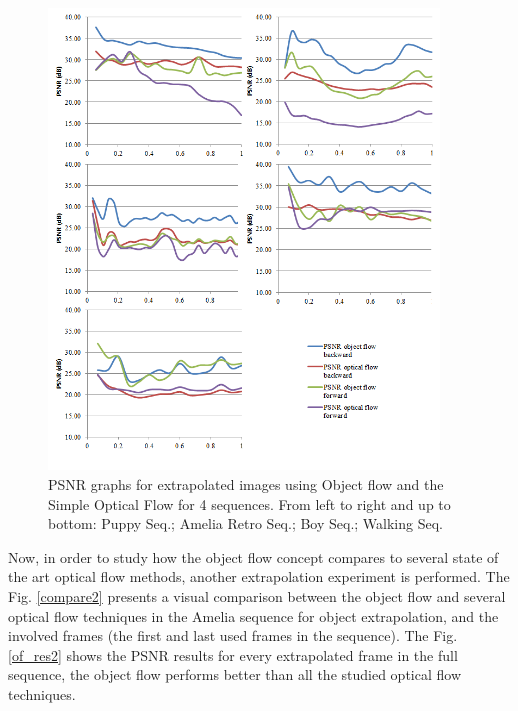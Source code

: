    \begin{figure}[hb]
      \centering
      \includegraphics[width=0.925\textwidth]{../images/psnr_v2.png}
      \caption{PSNR graphs for extrapolated images using Object flow and the Simple Optical Flow for 4 sequences. From left to right and up to bottom: Puppy Seq.; Amelia Retro Seq.; Boy Seq.; Walking Seq.}
      \label{of_res}
   \end{figure}


Now, in order to study how the object flow concept compares to several state of the art optical flow 
methods, another extrapolation experiment is performed. 
The Fig. \ref{compare2} presents a visual comparison between the object flow and several optical flow 
techniques in the Amelia sequence for object extrapolation, and the involved frames (the first and last used frames in the sequence). 
The Fig. \ref{of_res2} shows the PSNR results for every extrapolated frame in the full sequence, 
the object flow performs better than all the studied optical flow techniques.



